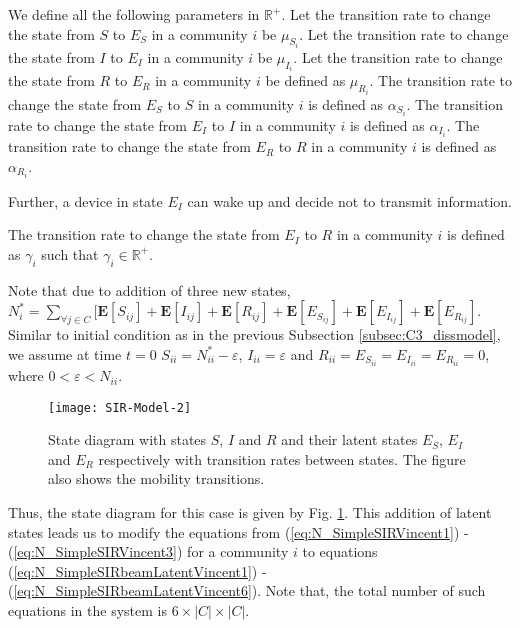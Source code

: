 \documentclass[review]{elsarticle}
\begin{document}
\begin{definition}\label{defdelta}
We define all the following parameters in $\mathbb{R}^+$. Let the transition rate to change the state from $S$ to $E_{S}$ in a community $i$ be $\mu_{S_i}$. Let the transition rate to change the state from $I$ to $E_{I}$ in a community $i$ be $\mu_{I_i}$. Let the transition rate to change the state from $R$ to $E_{R}$ in a community $i$ be defined as $\mu_{R_i}$. The transition rate to change the state from $E_{S}$ to $S$ in a community $i$ is defined as $\alpha_{S_i}$. The transition rate to change the state from $E_{I}$ to $I$ in a community $i$ is defined as $\alpha_{I_i}$. The transition rate to change the state from $E_{R}$ to $R$ in a community $i$ is defined as $\alpha_{R_i}$.
\end{definition}

Further, a device in state $E_I$ can wake up and decide not to transmit information.
\begin{definition}\label{defgamma}
The transition rate to change the state from $E_{I}$ to $R$ in a community $i$ is defined as $\gamma_{i}$ such that $\gamma_{i}\in \mathbb{R}^+$.
\end{definition}

Note that due to addition of three new states, $N_{i}^{*}=\sum_{\forall j\in C}[\mathbf{E}[S_{ij}]+\mathbf{E}[I_{ij}]+\mathbf{E}[R_{ij}]+\mathbf{E}[E_{S_{ij}}]+\mathbf{E}[E_{I_{ij}}]+\mathbf{E}[E_{R_{ij}}]$. Similar to initial condition as in the previous Subsection \ref{subsec:C3_dissmodel}, we assume at time $t=0$ $S_{ii}=N_{ii}^{*}-\varepsilon$, $I_{ii}=\varepsilon$ and $R_{ii}=E_{S_{ii}}=E_{I_{ii}}=E_{R_{ii}}=0$, where $0<\varepsilon<N_{ii}$.
\begin{figure}
    \centering
    \texttt{[image: SIR-Model-2]}
    \caption{State diagram with states $S$, $I$ and $R$ and their latent states $E_{S}$, $E_{I}$ and $E_{R}$ respectively with transition rates between states. The figure also shows the mobility transitions.}
    \label{fig:spreadingmodel}
\end{figure}

Thus, the state diagram for this case is given by Fig. \ref{fig:spreadingmodel}. This addition of latent states leads us to modify the equations from (\ref{eq:N_SimpleSIRVincent1}) - (\ref{eq:N_SimpleSIRVincent3}) for a community $i$ to equations (\ref{eq:N_SimpleSIRbeamLatentVincent1}) -  (\ref{eq:N_SimpleSIRbeamLatentVincent6}). Note that, the total number of such equations in the system is $6\times |C| \times |C|$.
\end{document}
